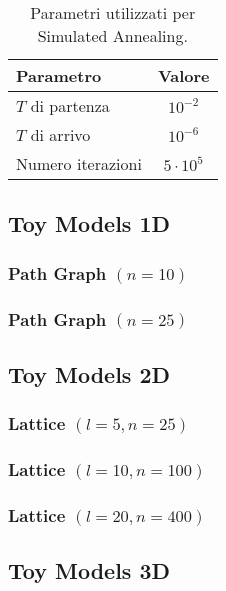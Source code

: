 \documentclass[10pt,a4paper]{article}
\begin{document}
\begin{table}[!htp]
    \centering
    \begin{tabular}{lc}
        \toprule
        Parametro & Valore \\
        \midrule
        \(T\) di partenza & \(10^{-2}\) \\
        \(T\) di arrivo & \(10^{-6}\) \\
        Numero iterazioni & \(5 \cdot 10^{5}\) \\
        \bottomrule
    \end{tabular}
    \caption{Parametri utilizzati per Simulated Annealing.}\label{tab:sa}
\end{table}

\subsection{Toy Models 1D}

\subsubsection{Path Graph \((n = 10)\)}

\subsubsection{Path Graph \((n = 25)\)}

\subsection{Toy Models 2D}

\subsubsection{Lattice \((l = 5, n = 25)\)}

\subsubsection{Lattice \((l = 10, n = 100)\)}

\subsubsection{Lattice \((l = 20, n = 400)\)}

\subsection{Toy Models 3D}
\end{document}
